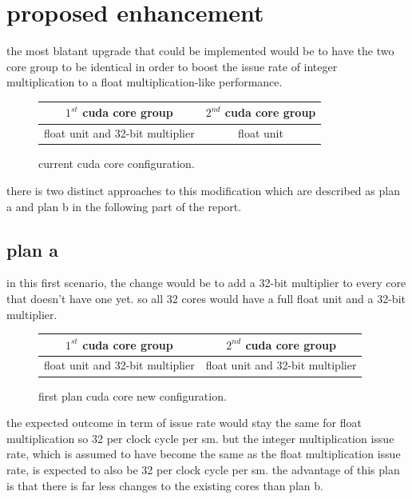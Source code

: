 \documentclass{report}
\begin{document}
   \section{proposed enhancement}
   the most blatant upgrade that could be implemented would be to have the two core group to be identical in order to boost the issue rate of integer multiplication to a float multiplication-like performance.
   \begin{figure}[h]
      \centering
       \begin{tabular}{ | c | c | }
    	    \hline
    	    $1^{st}$ cuda core group & $2^{nd}$ cuda core group \\ \hline
    	   float unit and 32-bit multiplier & float unit \\ \hline
  	\end{tabular}
  	\captionsetup{justification=centering}
  	\caption{current cuda core configuration.}
  	\label{fig:current_cores}
   \end{figure}
   there is two distinct approaches to this modification which are described as plan a and plan b in the following part of the report.
   \subsection{plan a}
    in this first scenario, the change would be to add a 32-bit multiplier to every core that doesn't have one yet. so all 32 cores would have a full float unit and a 32-bit multiplier.
    \begin{figure}[h]
      \centering
       \begin{tabular}{ | c | c | }
    	    \hline
    	    $1^{st}$ cuda core group & $2^{nd}$ cuda core group \\ \hline
    	   float unit and 32-bit multiplier & float unit and 32-bit multiplier \\ \hline
  	\end{tabular}
  	\captionsetup{justification=centering}
  	\caption{first plan cuda core new configuration.}
  	\label{fig:plana_cores}
   \end{figure}
    the expected outcome in term of issue rate would stay the same for float multiplication so 32 per clock cycle per sm. but the integer multiplication issue rate, which is assumed to have become the same as the float multiplication issue rate, is expected to also be 32 per clock cycle per sm.
    the advantage of this plan is that there is far less changes to the existing cores than plan b.
\end{document}
